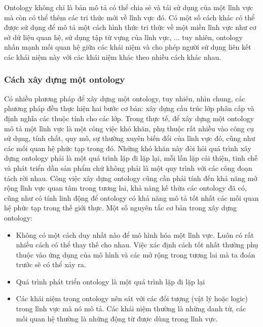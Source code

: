 Ontology không chỉ là bản mô tả có thể chia sẻ và tái sử dụng của một lĩnh vực mà còn có thể thêm các tri thức mới về lĩnh vực đó. 
Có một số cách khác có thể được sử dụng để mô tả một cách hình thức tri thức về một miền lĩnh vực như cơ sở dữ liệu quan hệ, sử dụng tập từ vựng của lĩnh vực, ... tuy nhiên, ontology nhấn mạnh mối quan hệ giữa các khái niệm và cho phép người sử dụng liên kết các khái niệm này với các khái niệm khác theo nhiều cách khác nhau. 

\subsubsection{Cách xây dựng một ontology}

Có nhiều phương pháp để xây dựng một ontology, tuy nhiên, nhìn chung, các phương pháp đều thực hiện hai bước cơ bản: xây dựng cấu trúc lớp phân cấp và định nghĩa các thuộc tính cho các lớp. Trong thực tế, để xây dựng một ontology mô tả một lĩnh vực là một công việc khó khăn, phụ thuộc rất nhiều vào công cụ sử dụng, tính chất, quy mô, sự thường xuyên biến đổi của lĩnh vực đó, cũng như các mối quan hệ phức tạp trong đó. Những khó khăn này đòi hỏi quá trình xây dựng ontology phải là một quá trình lặp đi lặp lại, mỗi lần lặp cải thiện, tinh chế và phát triển dần sản phẩm chứ không phải là một quy trình với các công đoạn tách rời nhau. Công việc xây dựng ontology cũng cần phải tính đến khả năng mở rộng lĩnh vực quan tâm trong tương lai, khả năng kế thừa các ontology đã có, cũng như có tính linh động để ontology có khả năng mô tả tốt nhất các mối quan hệ phức tạp trong thế giới thực. 
Một số nguyên tắc cơ bản trong xây dựng ontology:

\begin{itemize}
	\item Không có một cách duy nhất nào để mô hình hóa một lĩnh vực. Luôn có rất nhiều cách có thể thay thế cho nhau. Việc xác định cách tốt nhất thường phụ thuộc vào ứng dụng của mô hình và các mở rộng trong tương lai mà ta đoán trước sẽ có thể xảy ra.
	\item Quá trình phát triển ontology là một quá trình lặp đi lặp lại
	\item Các khái niệm trong ontology nên sát với các đối tượng (vật lý hoặc logic) trong lĩnh vực mà nó mô tả. Các khái niệm thường là những danh từ, các mối quan hệ thường là những động từ được dùng trong lĩnh vực.
\end{itemize}

